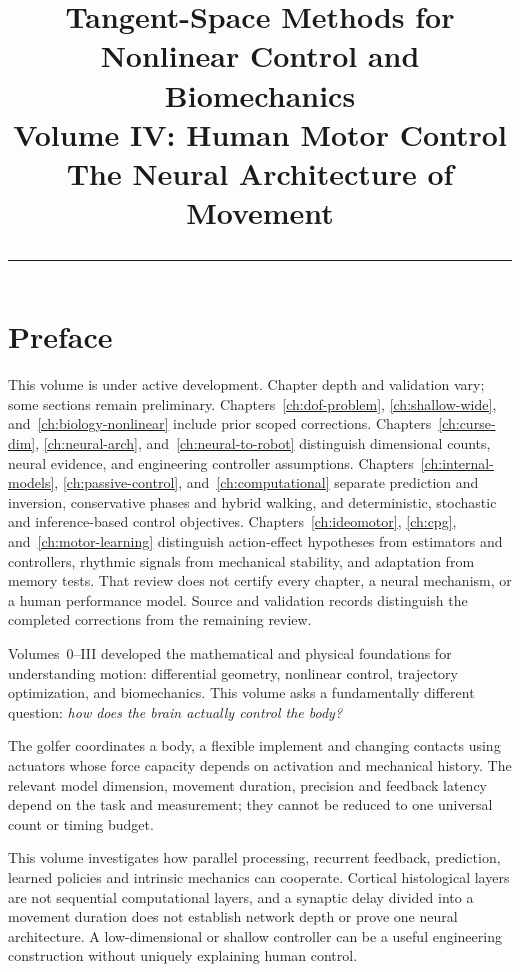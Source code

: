 \documentclass[10pt,letterpaper,openany]{book}
\title{%
  {\Huge\bfseries\color{chapblue} Tangent-Space Methods for Nonlinear Control and Biomechanics}\\[0.4cm]
  {\Large Volume IV: Human Motor Control\\
  The Neural Architecture of Movement}\\[0.6cm]
  {\color{chapblue}\rule{\textwidth}{2pt}}
}
\date{}
\theoremstyle{plain}
\begin{document}
\maketitle
\thispagestyle{empty}
\cleardoublepage

\frontmatter
\chapter*{Preface}

\begin{gomdraftnotice}
This volume is under active development. Chapter depth and validation vary;
some sections remain preliminary. Chapters~\ref{ch:dof-problem},
\ref{ch:shallow-wide}, and~\ref{ch:biology-nonlinear} include prior scoped
corrections. Chapters~\ref{ch:curse-dim}, \ref{ch:neural-arch},
and~\ref{ch:neural-to-robot} distinguish dimensional counts, neural evidence,
and engineering controller assumptions.
Chapters~\ref{ch:internal-models}, \ref{ch:passive-control}, and~\ref{ch:computational}
separate prediction and inversion, conservative phases and hybrid walking,
and deterministic, stochastic and inference-based control objectives.
Chapters~\ref{ch:ideomotor}, \ref{ch:cpg}, and~\ref{ch:motor-learning}
distinguish action-effect hypotheses from estimators and controllers,
rhythmic signals from mechanical stability, and adaptation from memory tests.
That review does not certify every chapter, a neural mechanism, or a human
performance model. Source and validation records distinguish the completed
corrections from the remaining review.
\end{gomdraftnotice}

Volumes~0--III developed the mathematical and physical foundations for understanding
motion: differential geometry, nonlinear control, trajectory optimization, and
biomechanics. This volume asks a fundamentally different question: \emph{how does the
brain actually control the body?}

The golfer coordinates a body, a flexible implement and changing contacts using
actuators whose force capacity depends on activation and mechanical history.
The relevant model dimension, movement duration, precision and feedback latency
depend on the task and measurement; they cannot be reduced to one universal
count or timing budget.

This volume investigates how parallel processing, recurrent feedback,
prediction, learned policies and intrinsic mechanics can cooperate. Cortical
histological layers are not sequential computational layers, and a synaptic
delay divided into a movement duration does not establish network depth or
prove one neural architecture. A low-dimensional or shallow controller can be
a useful engineering construction without uniquely explaining human control.
\end{document}
